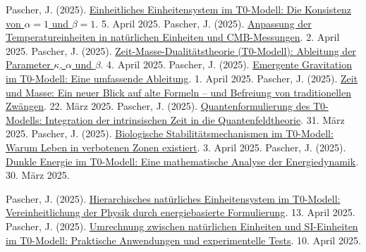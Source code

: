 \documentclass[12pt,a4paper]{article}
\begin{document}
\begin{thebibliography}{99}
	 Pascher, J. (2025). \href{https://github.com/jpascher/T0-Time-Mass-Duality/tree/main/2/pdf/Deutsch/Alpha1Beta1Konsistenz.pdf}{Einheitliches Einheitensystem im T0-Modell: Die Konsistenz von \(\alpha = 1\) und \(\beta = 1\)}. 5. April 2025.
	 Pascher, J. (2025). \href{https://github.com/jpascher/T0-Time-Mass-Duality/tree/main/2/pdf/Deutsch/TempEinheitenCMB.pdf}{Anpassung der Temperatureinheiten in natürlichen Einheiten und CMB-Messungen}. 2. April 2025.
	 Pascher, J. (2025). \href{https://github.com/jpascher/T0-Time-Mass-Duality/tree/main/2/pdf/Deutsch/ZeitMasseT0Params.pdf}{Zeit-Masse-Dualitätstheorie (T0-Modell): Ableitung der Parameter \(\kappa\), \(\alpha\) und \(\beta\)}. 4. April 2025.
	 Pascher, J. (2025). \href{https://github.com/jpascher/T0-Time-Mass-Duality/tree/main/2/pdf/Deutsch/EmergentGravT0.pdf}{Emergente Gravitation im T0-Modell: Eine umfassende Ableitung}. 1. April 2025.
	 Pascher, J. (2025). \href{https://github.com/jpascher/T0-Time-Mass-Duality/tree/main/2/pdf/Deutsch/ZeitMasseNeuerBlick.pdf}{Zeit und Masse: Ein neuer Blick auf alte Formeln – und Befreiung von traditionellen Zwängen}. 22. März 2025.
	 Pascher, J. (2025). \href{https://github.com/jpascher/T0-Time-Mass-Duality/tree/main/2/pdf/Deutsch/QuantumFormulationT0.pdf}{Quantenformulierung des T0-Modells: Integration der intrinsischen Zeit in die Quantenfeldtheorie}. 31. März 2025.
	 Pascher, J. (2025). \href{https://github.com/jpascher/T0-Time-Mass-Duality/tree/main/2/pdf/Deutsch/BioStabilityT0.pdf}{Biologische Stabilitätsmechanismen im T0-Modell: Warum Leben in verbotenen Zonen existiert}. 3. April 2025.
	 Pascher, J. (2025). \href{https://github.com/jpascher/T0-Time-Mass-Duality/tree/main/2/pdf/Deutsch/MathEnergiedynamik.pdf}{Dunkle Energie im T0-Modell: Eine mathematische Analyse der Energiedynamik}. 30. März 2025.

 Pascher, J. (2025). \href{https://github.com/jpascher/T0-Time-Mass-Duality/tree/main/2/pdf/Deutsch/NatEinheitenSystematik.pdf}{Hierarchisches natürliches Einheitensystem im T0-Modell: Vereinheitlichung der Physik durch energiebasierte Formulierung}. 13. April 2025.
 Pascher, J. (2025). \href{https://github.com/jpascher/T0-Time-Mass-Duality/tree/main/2/pdf/Deutsch/NatEinheitenKonversion.pdf}{Umrechnung zwischen natürlichen Einheiten und SI-Einheiten im T0-Modell: Praktische Anwendungen und experimentelle Tests}. 10. April 2025.


\end{thebibliography}
\end{document}

